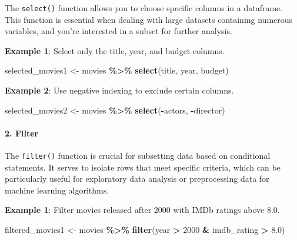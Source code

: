 \documentclass[
  b5paper]{book}
\newenvironment{Shaded}{\begin{snugshade}}{\end{snugshade}}
\newcommand{\DecValTok}[1]{\textcolor[rgb]{0.00,0.00,0.81}{#1}}
\newcommand{\FloatTok}[1]{\textcolor[rgb]{0.00,0.00,0.81}{#1}}
\newcommand{\FunctionTok}[1]{\textcolor[rgb]{0.13,0.29,0.53}{\textbf{#1}}}
\newcommand{\NormalTok}[1]{#1}
\newcommand{\OtherTok}[1]{\textcolor[rgb]{0.56,0.35,0.01}{#1}}
\newcommand{\SpecialCharTok}[1]{\textcolor[rgb]{0.81,0.36,0.00}{\textbf{#1}}}
\begin{document}
The \texttt{select()} function allows you to choose specific columns in a dataframe. This function is essential when dealing with large datasets containing numerous variables, and you're interested in a subset for further analysis.

\textbf{Example 1}: Select only the title, year, and budget columns.

\begin{Shaded}
\begin{Highlighting}[]
\NormalTok{selected\_movies1 }\OtherTok{\textless{}{-}}\NormalTok{ movies }\SpecialCharTok{\%\textgreater{}\%}
  \FunctionTok{select}\NormalTok{(title, year, budget)}
\end{Highlighting}
\end{Shaded}

\textbf{Example 2}: Use negative indexing to exclude certain columns.

\begin{Shaded}
\begin{Highlighting}[]
\NormalTok{selected\_movies2 }\OtherTok{\textless{}{-}}\NormalTok{ movies }\SpecialCharTok{\%\textgreater{}\%}
  \FunctionTok{select}\NormalTok{(}\SpecialCharTok{{-}}\NormalTok{actors, }\SpecialCharTok{{-}}\NormalTok{director)}
\end{Highlighting}
\end{Shaded}

\hypertarget{filter}{%
\paragraph*{2. Filter}\label{filter}}

The \texttt{filter()} function is crucial for subsetting data based on conditional statements. It serves to isolate rows that meet specific criteria, which can be particularly useful for exploratory data analysis or preprocessing data for machine learning algorithms.

\textbf{Example 1}: Filter movies released after 2000 with IMDb ratings above 8.0.

\begin{Shaded}
\begin{Highlighting}[]
\NormalTok{filtered\_movies1 }\OtherTok{\textless{}{-}}\NormalTok{ movies }\SpecialCharTok{\%\textgreater{}\%}
  \FunctionTok{filter}\NormalTok{(year }\SpecialCharTok{\textgreater{}} \DecValTok{2000} \SpecialCharTok{\&}\NormalTok{ imdb\_rating }\SpecialCharTok{\textgreater{}} \FloatTok{8.0}\NormalTok{)}
\end{Highlighting}
\end{Shaded}
\end{document}
